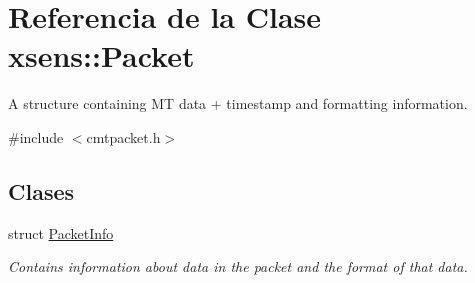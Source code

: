 \hypertarget{classxsens_1_1Packet}{\section{\-Referencia de la \-Clase xsens\-:\-:\-Packet}
\label{classxsens_1_1Packet}
}


\-A structure containing \-M\-T data + timestamp and formatting information.  




{\ttfamily \#include $<$cmtpacket.\-h$>$}

\subsection*{\-Clases}
\begin{DoxyCompactItemize}
\item 
struct \hyperlink{structxsens_1_1Packet_1_1PacketInfo}{\-Packet\-Info}
\begin{DoxyCompactList}\small\item\em \-Contains information about data in the packet and the format of that data. \end{DoxyCompactList}\end{DoxyCompactItemize}
